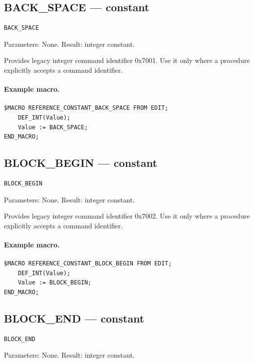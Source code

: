 \documentclass[a4paper,10pt,twoside,openany]{book}
\begin{document}
\label{prim:constant-back-space}
\subsection*{BACK\_SPACE --- constant}
\begin{verbatim}
BACK_SPACE
\end{verbatim}
Parameters: None. Result: integer constant.

Provides legacy integer command identifier 0x7001. Use it only where a procedure explicitly accepts a command identifier.

\paragraph{Example macro.}
\begin{verbatim}
$MACRO REFERENCE_CONSTANT_BACK_SPACE FROM EDIT;
    DEF_INT(Value);
    Value := BACK_SPACE;
END_MACRO;
\end{verbatim}

\label{prim:constant-block-begin}
\subsection*{BLOCK\_BEGIN --- constant}
\begin{verbatim}
BLOCK_BEGIN
\end{verbatim}
Parameters: None. Result: integer constant.

Provides legacy integer command identifier 0x7002. Use it only where a procedure explicitly accepts a command identifier.

\paragraph{Example macro.}
\begin{verbatim}
$MACRO REFERENCE_CONSTANT_BLOCK_BEGIN FROM EDIT;
    DEF_INT(Value);
    Value := BLOCK_BEGIN;
END_MACRO;
\end{verbatim}

\label{prim:constant-block-end}
\subsection*{BLOCK\_END --- constant}
\begin{verbatim}
BLOCK_END
\end{verbatim}
Parameters: None. Result: integer constant.
\end{document}
